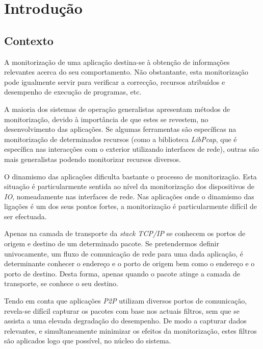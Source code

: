 \chapter{Introdução}\label{cap:introducao}

\section{Contexto}
\label{sec:intro_context}
A monitorização de uma aplicação destina-se à obtenção de informações relevantes acerca do seu comportamento.
Não obstantante, esta monitorização pode igualmente servir para verificar a correcção, recursos atribuídos e desempenho de execução de programas, etc.

A maioria dos sistemas de operação generalistas apresentam métodos de monitorização, devido à importância de que estes se revestem, no desenvolvimento das aplicações.
Se algumas ferramentas são específicas na monitorização de determinados recursos (como a biblioteca \textit{LibPcap}, que é específica nas interacções com o exterior utilizando interfaces de rede), outras são mais generalistas podendo monitorizar recursos diversos.

O dinamismo das aplicações dificulta bastante o processo de monitorização.
Esta situação é particularmente sentida ao nível da monitorização dos dispositivos de \textit{IO}, nomeadamente nas interfaces de rede.
Nas aplicações onde o dinamismo das ligações é um dos seus pontos fortes, a monitorização é particularmente difícil de ser efectuada.

Apenas na camada de transporte da \textit{stack TCP/IP} se conhecem os portos de origem e destino de um determinado pacote.
Se pretendermos definir univocamente, um fluxo de comunicação de rede para uma dada aplicação, é determinante conhecer o endereço e o porto de origem bem como o endereço e o porto de destino.
Desta forma, apenas quando o pacote atinge a camada de transporte, se conhece o seu destino.

Tendo em conta que aplicações \textit{P2P} utilizam diversos portos de comunicação, revela-se difícil capturar os pacotes com base nos actuais filtros, sem que se assista a uma elevada degradação do desempenho.
De modo a capturar dados relevantes, e simultaneamente minimizar os efeitos da monitorização, estes filtros são aplicados logo que possível, no núcleo do sistema.

